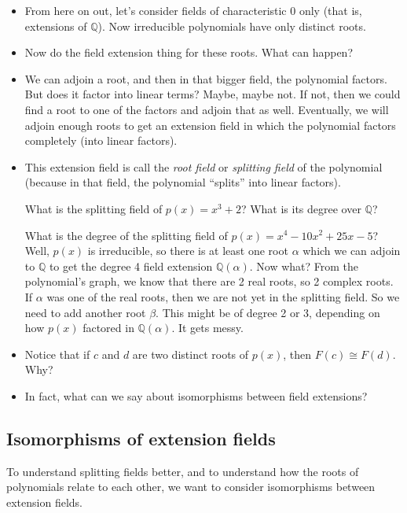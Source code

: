 \documentclass[12pt]{article}
\theoremstyle{plain}
\theoremstyle{definition}
\theoremstyle{remark}
\newcommand{\ex}{\noindent{\bf Ex: }}
\def\Q{\mathbb Q}
\begin{document}
  \begin{itemize}

  \item From here on out, let's consider fields of characteristic 0 only (that is, extensions of $\Q$).  Now irreducible polynomials have only distinct roots.

  \item Now do the field extension thing for these roots.  What can happen?

  \item We can adjoin a root, and then in that bigger field, the polynomial factors.  But does it factor into linear terms?  Maybe, maybe not.  If not, then we could find a root to one of the factors and adjoin that as well.  Eventually, we will adjoin enough roots to get an extension field in which the polynomial factors completely (into linear factors).

  \item This extension field is call the {\em root field} or {\em splitting field} of the polynomial (because in that field, the polynomial ``splits'' into linear factors).

  \ex What is the splitting field of $p(x) = x^3 + 2$?  What is its degree over $\Q$?

  \ex What is the degree of the splitting field of $p(x) = x^4 - 10x^2 + 25x - 5$?  Well, $p(x)$ is irreducible, so there is at least one root $\alpha$ which we can adjoin to $\Q$ to get the degree 4 field extension $\Q(\alpha)$.  Now what?  From the polynomial's graph, we know that there are 2 real roots, so 2 complex roots.  If $\alpha$ was one of the real roots, then we are not yet in the splitting field.  So we need to add another root $\beta$.  This might be of degree 2 or 3, depending on how $p(x)$ factored in $\Q(\alpha)$.  It gets messy.

  \item Notice that if $c$ and $d$ are two distinct roots of $p(x)$, then $F(c) \cong F(d)$.  Why?

  \item In fact, what can we say about isomorphisms between field extensions?  

\end{itemize}
\subsection*{Isomorphisms of extension fields}

To understand splitting fields better, and to understand how the roots of polynomials relate to each other, we want to consider isomorphisms between extension fields.
\end{document}
